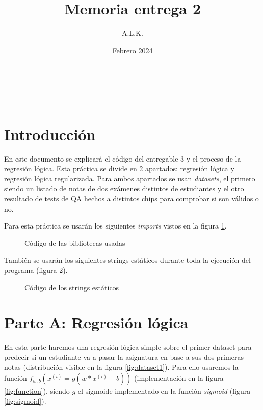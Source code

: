 \documentclass[6pt]{AiTex}
\title{Memoria entrega 2}
\author{A.L.K.}
\date{Febrero 2024}
\begin{document}
\justify

\begin{center}

    {\huge \textbf{\underline{\subtitulo}}} \\
    { \lesson - \autor}

\end{center}


\section*{Introducción}

En este documento se explicará el código del entregable 3 y el proceso de la regresión lógica. Esta práctica se divide en 2 apartados: regresión lógica y regresión lógica regularizada. Para ambos apartados se usan \textit{datasets}, el primero siendo un listado de notas de dos exámenes distintos de estudiantes y el otro resultado de tests de QA hechos a distintos chips para comprobar si son válidos o no.

Para esta práctica se usarán los siguientes \textit{imports} vistos en la figura \ref{fig:imports}.

\begin{figure}[H]
    \centering
    
    \caption{Código de las bibliotecas usadas}
    \label{fig:imports}
\end{figure}

También se usarán los siguientes strings estáticos durante toda la ejecución del programa (figura \ref{fig:strings}).

\begin{figure}[H]
    \centering
    
    \caption{Código de los strings estáticos}
    \label{fig:strings}
\end{figure}

\section{Parte A: Regresión lógica}

En esta parte haremos una regresión lógica simple sobre el primer dataset para predecir si un estudiante va a pasar la asignatura en base a sus dos primeras notas (distribución visible en la figura \ref{fig:dataset1}). Para ello usaremos la función $f_{w,b}(x^{(i)} = g(w * x^{(i)} +b))$ (implementación en la figura \ref{fig:function}), siendo $g$ el sigmoide implementado en la función \textit{sigmoid} (figura \ref{fig:sigmoid}).
\end{document}
